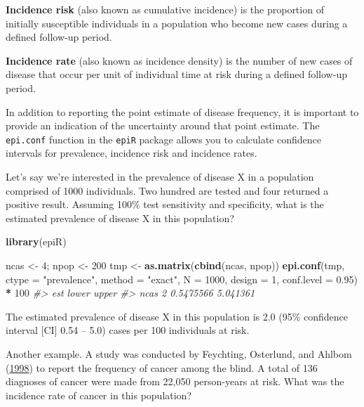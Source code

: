 \documentclass[
]{article}
\newenvironment{Shaded}{\begin{snugshade}}{\end{snugshade}}
\newcommand{\CommentTok}[1]{\textcolor[rgb]{0.56,0.35,0.01}{\textit{#1}}}
\newcommand{\DataTypeTok}[1]{\textcolor[rgb]{0.13,0.29,0.53}{#1}}
\newcommand{\DecValTok}[1]{\textcolor[rgb]{0.00,0.00,0.81}{#1}}
\newcommand{\FloatTok}[1]{\textcolor[rgb]{0.00,0.00,0.81}{#1}}
\newcommand{\KeywordTok}[1]{\textcolor[rgb]{0.13,0.29,0.53}{\textbf{#1}}}
\newcommand{\NormalTok}[1]{#1}
\newcommand{\OperatorTok}[1]{\textcolor[rgb]{0.81,0.36,0.00}{\textbf{#1}}}
\newcommand{\StringTok}[1]{\textcolor[rgb]{0.31,0.60,0.02}{#1}}
\begin{document}
\textbf{Incidence risk} (also known as cumulative incidence) is the
proportion of initially susceptible individuals in a population who
become new cases during a defined follow-up period.

\textbf{Incidence rate} (also known as incidence density) is the number
of new cases of disease that occur per unit of individual time at risk
during a defined follow-up period.

In addition to reporting the point estimate of disease frequency, it is
important to provide an indication of the uncertainty around that point
estimate. The \texttt{epi.conf} function in the \texttt{epiR} package
allows you to calculate confidence intervals for prevalence, incidence
risk and incidence rates.

Let's say we're interested in the prevalence of disease X in a
population comprised of 1000 individuals. Two hundred are tested and
four returned a positive result. Assuming 100\% test sensitivity and
specificity, what is the estimated prevalence of disease X in this
population?

\begin{Shaded}
\begin{Highlighting}[]
\KeywordTok{library}\NormalTok{(epiR)}

\NormalTok{ncas \textless{}{-}}\StringTok{ }\DecValTok{4}\NormalTok{; npop \textless{}{-}}\StringTok{ }\DecValTok{200}
\NormalTok{tmp \textless{}{-}}\StringTok{ }\KeywordTok{as.matrix}\NormalTok{(}\KeywordTok{cbind}\NormalTok{(ncas, npop))}
\KeywordTok{epi.conf}\NormalTok{(tmp, }\DataTypeTok{ctype =} \StringTok{"prevalence"}\NormalTok{, }\DataTypeTok{method =} \StringTok{"exact"}\NormalTok{, }\DataTypeTok{N =} \DecValTok{1000}\NormalTok{, }\DataTypeTok{design =} \DecValTok{1}\NormalTok{, }
   \DataTypeTok{conf.level =} \FloatTok{0.95}\NormalTok{) }\OperatorTok{*}\StringTok{ }\DecValTok{100}
\CommentTok{\#\textgreater{}      est     lower    upper}
\CommentTok{\#\textgreater{} ncas   2 0.5475566 5.041361}
\end{Highlighting}
\end{Shaded}

The estimated prevalence of disease X in this population is 2.0 (95\%
confidence interval {[}CI{]} 0.54 -- 5.0) cases per 100 individuals at
risk.

Another example. A study was conducted by Feychting, Osterlund, and
Ahlbom (\protect\hyperlink{ref-feychting_et_al:1998}{1998}) to report
the frequency of cancer among the blind. A total of 136 diagnoses of
cancer were made from 22,050 person-years at risk. What was the
incidence rate of cancer in this population?
\end{document}
